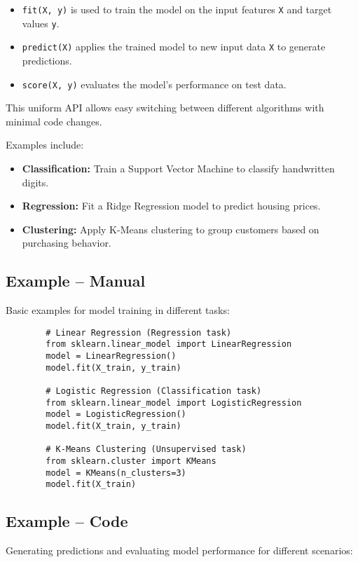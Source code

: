 \begin{itemize}
	\item \texttt{fit(X, y)} is used to train the model on the input features \texttt{X} and target values \texttt{y}.
	\item \texttt{predict(X)} applies the trained model to new input data \texttt{X} to generate predictions.
	\item \texttt{score(X, y)} evaluates the model’s performance on test data.
\end{itemize}

This uniform API allows easy switching between different algorithms with minimal code changes.

Examples include:

\begin{itemize}
	\item \textbf{Classification:} Train a Support Vector Machine to classify handwritten digits.
	\item \textbf{Regression:} Fit a Ridge Regression model to predict housing prices.
	\item \textbf{Clustering:} Apply K-Means clustering to group customers based on purchasing behavior.
\end{itemize}

\subsection{Example -- Manual}
Basic examples for model training in different tasks:

\begin{framed}
	\begin{verbatim}
		# Linear Regression (Regression task)
		from sklearn.linear_model import LinearRegression
		model = LinearRegression()
		model.fit(X_train, y_train)
		
		# Logistic Regression (Classification task)
		from sklearn.linear_model import LogisticRegression
		model = LogisticRegression()
		model.fit(X_train, y_train)
		
		# K-Means Clustering (Unsupervised task)
		from sklearn.cluster import KMeans
		model = KMeans(n_clusters=3)
		model.fit(X_train)
	\end{verbatim}
\end{framed}

\subsection{Example -- Code}
Generating predictions and evaluating model performance for different scenarios:


